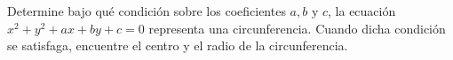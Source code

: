 \item Determine bajo qué condición sobre los coeficientes $a, b \text{ y } c$, la ecuación $x^2 + y^2 + ax + by + c = 0$ representa una circunferencia. Cuando dicha condición se satisfaga, encuentre el centro y el radio de la circunferencia.
